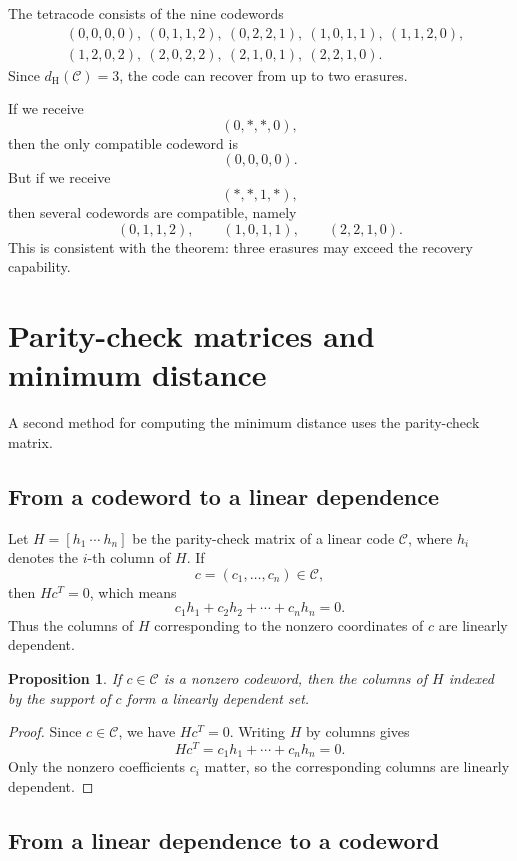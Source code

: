 \documentclass[11pt]{article}
\newtheorem{proposition}{Proposition}[section]
\theoremstyle{definition}
\theoremstyle{remark}
\newcommand{\code}{\mathcal{C}}
\newcommand{\dH}{d_{\mathrm H}}
\begin{document}
The tetracode consists of the nine codewords
\[
\begin{aligned}
&(0,0,0,0),\ (0,1,1,2),\ (0,2,2,1),\ (1,0,1,1),\ (1,1,2,0),\\
&(1,2,0,2),\ (2,0,2,2),\ (2,1,0,1),\ (2,2,1,0).
\end{aligned}
\]
Since $\dH(\code)=3$, the code can recover from up to two erasures.

If we receive
\[
(0,*,*,0),
\]
then the only compatible codeword is
\[
(0,0,0,0).
\]
But if we receive
\[
(*,*,1,*),
\]
then several codewords are compatible, namely
\[
(0,1,1,2),\qquad (1,0,1,1),\qquad (2,2,1,0).
\]
This is consistent with the theorem: three erasures may exceed the recovery capability.

\section{Parity-check matrices and minimum distance}

A second method for computing the minimum distance uses the parity-check matrix.

\subsection{From a codeword to a linear dependence}

Let $H=[h_1\ \cdots\ h_n]$ be the parity-check matrix of a linear code $\code$, where $h_i$ denotes the $i$-th column of $H$. If
\[
c=(c_1,\dots,c_n)\in\code,
\]
then $Hc^T=0$, which means
\[
c_1h_1+c_2h_2+\cdots+c_nh_n=0.
\]
Thus the columns of $H$ corresponding to the nonzero coordinates of $c$ are linearly dependent.

\begin{proposition}
If $c\in\code$ is a nonzero codeword, then the columns of $H$ indexed by the support of $c$ form a linearly dependent set.
\end{proposition}

\begin{proof}
Since $c\in\code$, we have $Hc^T=0$. Writing $H$ by columns gives
\[
Hc^T=c_1h_1+\cdots+c_nh_n=0.
\]
Only the nonzero coefficients $c_i$ matter, so the corresponding columns are linearly dependent.
\end{proof}

\subsection{From a linear dependence to a codeword}
\end{document}
